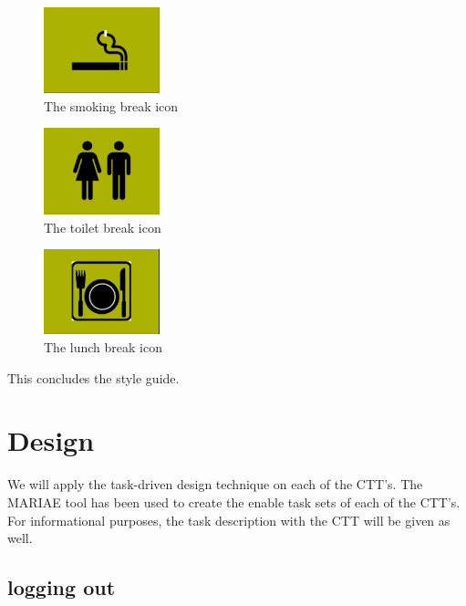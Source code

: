 \documentclass[11pt, a4paper,svglistings]{report}
\begin{document}
\begin{figure}[H]
\centering
    \includegraphics[width=0.3\textwidth]{SmokingBreak.png}
  \caption[The spinner]{The smoking break icon}
\end{figure}

\begin{figure}[H]
\centering
    \includegraphics[width=0.3\textwidth]{ToiletBreak.png}
  \caption[The spinner]{The toilet break icon}
\end{figure}

\begin{figure}[H]
\centering
    \includegraphics[width=0.3\textwidth]{LunchBreak.png}
  \caption[The spinner]{The lunch break icon}
\end{figure}

This concludes the style guide.


\chapter{Design}

We will apply the task-driven design technique on each of the CTT's. The MARIAE tool has been used to create the enable task sets of each of the CTT's. For informational purposes, the task description with the CTT will be given as well.

\section{logging out}
\end{document}

